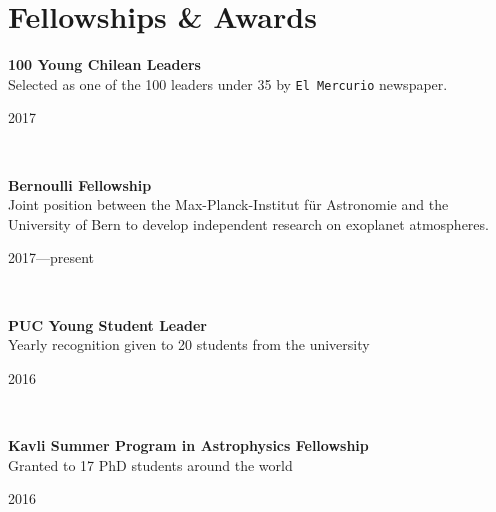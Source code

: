 \documentclass[11pt, a4paper]{article} %
\begin{document}
\section*{Fellowships \& Awards}

\begin{minipage}[t]{0.7\textwidth}
\begin{flushleft}%
  \setlength{\leftskip}{0.2cm}%
\textbf{100 Young Chilean Leaders}\\
Selected as one of the 100 leaders under 35 by \texttt{El Mercurio} newspaper.
\end{flushleft}
\end{minipage}
\begin{minipage}[t]{0.3\textwidth}
\hfill 2017
\end{minipage}\\

\begin{minipage}[t]{0.7\textwidth}
\begin{flushleft}%
  \setlength{\leftskip}{0.2cm}%
\textbf{Bernoulli Fellowship}\\
Joint position between the Max-Planck-Institut f\"ur Astronomie and the University of Bern to develop independent research on exoplanet atmospheres.
\end{flushleft}
\end{minipage}
\begin{minipage}[t]{0.3\textwidth}
\hfill 2017---present
\end{minipage}\\

\begin{minipage}[t]{0.7\textwidth}
\begin{flushleft}%
  \setlength{\leftskip}{0.2cm}%
\textbf{PUC Young Student Leader}\\
Yearly recognition given to 20 students from the university
\end{flushleft}
\end{minipage}
\begin{minipage}[t]{0.3\textwidth}
\hfill 2016
\end{minipage}\\

\begin{minipage}[t]{0.7\textwidth}
\begin{flushleft}%
  \setlength{\leftskip}{0.2cm}%
\textbf{Kavli Summer Program in Astrophysics Fellowship}\\
Granted to 17 PhD students around the world
\end{flushleft}
\end{minipage}
\begin{minipage}[t]{0.3\textwidth}
\hfill 2016
\end{minipage}\\
\end{document}
